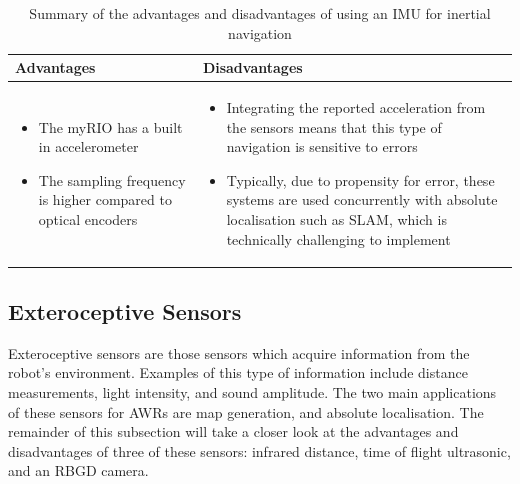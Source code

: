 \documentclass[a4paper]{article}
\begin{document}
\begin{table}[h]
\centering
\caption{Summary of the advantages and disadvantages of using an IMU for inertial navigation} \footnotesize
\begin{tabular}{p{8cm}p{8cm}}
\toprule
\textbf{Advantages} & \textbf{Disadvantages}\\
\midrule
\begin{itemize}[leftmargin=0.3cm] \item The myRIO has a built in accelerometer \item The sampling frequency is higher compared to optical encoders \end{itemize} & \begin{itemize}[leftmargin=0.3cm] \item Integrating the reported acceleration from the sensors means that this type of navigation is sensitive to errors \item Typically, due to propensity for error, these systems are used concurrently with absolute localisation such as SLAM, which is technically challenging to implement \end{itemize}\\
\bottomrule
\end{tabular}
\end{table}

\newpage

\subsection{Exteroceptive Sensors}
Exteroceptive sensors are those sensors which acquire information from the robot's environment. Examples of this type of information include distance measurements, light intensity, and sound amplitude. The two main applications of these sensors for AWRs are map generation, and absolute localisation. The remainder of this subsection will take a closer look at the advantages and disadvantages of three of these sensors: infrared distance, time of flight ultrasonic, and an RBGD camera.
\end{document}
